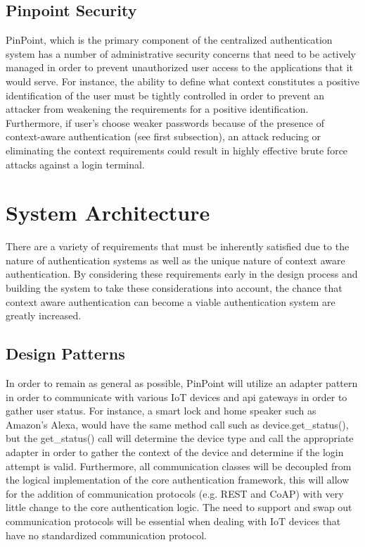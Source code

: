 \documentclass[11pt,journal]{IEEEtran}
\begin{document}
\subsection{Pinpoint Security}
PinPoint, which is the primary component of the centralized authentication system has a number of administrative security concerns that need to be actively managed in order to prevent unauthorized user access to the applications that it would serve.  For instance, the ability to define what context constitutes a positive identification of the user must be tightly controlled in order to prevent an attacker from weakening the requirements for a positive identification.  Furthermore, if user's choose weaker passwords because of the presence of context-aware authentication (see first subsection), an attack reducing or eliminating the context requirements could result in highly effective brute force attacks against a login terminal. 

\section{System Architecture}
There are a variety of requirements that must be inherently satisfied due to the nature of authentication systems as well as the unique nature of context aware authentication.  By considering these requirements early in the design process and building the system to take these considerations into account, the chance that context aware authentication can become a viable authentication system are greatly increased.

\subsection{Design Patterns}
In order to remain as general as possible, PinPoint will utilize an adapter pattern in order to communicate with various IoT devices and api gateways in order to gather user status.  For instance, a smart lock and home speaker such as Amazon’s Alexa, would have the same method call such as device.get\_status(), but the get\_status() call will determine the device type and call the appropriate adapter in order to gather the context of the device and determine if the login attempt is valid.  Furthermore, all communication classes will be decoupled from the logical implementation of the core authentication framework, this will allow for the addition of communication protocols (e.g. REST and CoAP) with very little change to the core authentication logic.  The need to support and swap out communication protocols will be essential when dealing with IoT devices that have no standardized communication protocol.
\end{document}
